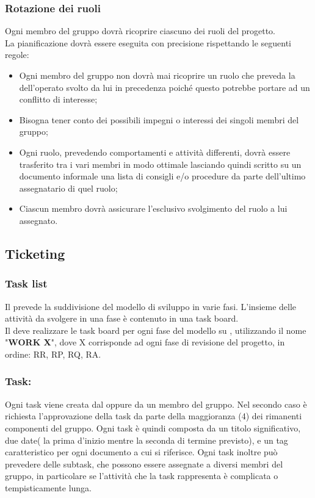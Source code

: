\documentclass[NormeDiProgetto.tex]{subfiles}
\begin{document}
	\subsubsection{Rotazione dei ruoli}
	Ogni membro del gruppo dovrà ricoprire ciascuno dei ruoli del progetto.\\
	La pianificazione dovrà essere eseguita con precisione rispettando le seguenti regole:
	\begin{itemize}
		\item Ogni membro del gruppo non dovrà mai ricoprire un ruolo che preveda la  dell'operato svolto da lui in precedenza poiché questo potrebbe	portare ad un conflitto di interesse;
		\item Bisogna tener conto dei possibili impegni o interessi dei singoli membri del gruppo;
		\item Ogni ruolo, prevedendo comportamenti e attività differenti, dovrà essere trasferito tra i vari membri in modo ottimale lasciando quindi scritto su un documento informale una lista di consigli e/o procedure da parte dell'ultimo assegnatario di quel ruolo;
		\item Ciascun membro dovrà assicurare l'esclusivo svolgimento del ruolo a lui assegnato.
	\end{itemize}
	
	
	\subsection{Ticketing}
	\subsubsection{Task list}
	Il \pdp{} prevede la suddivisione del modello di sviluppo in varie fasi.
	L'insieme delle attività da svolgere in una fase è contenuto in una task board.\\
	Il \respdiprog{} deve realizzare le task board per ogni fase del modello su , utilizzando il nome "\textbf{WORK X}", dove X corrisponde ad ogni fase di revisione del progetto, in ordine: RR, RP, RQ, RA.
	
	\subsubsection{Task:}
	Ogni task viene creata dal \respdiprog{} oppure da un membro del gruppo. Nel secondo caso è richiesta l'approvazione della task da parte della maggioranza (4) dei rimanenti componenti del gruppo.
	Ogni task è quindi composta da un titolo significativo, due date( la prima d'inizio mentre la seconda di termine previsto), e un tag caratteristico per ogni documento a cui si riferisce. Ogni task inoltre può prevedere delle subtask, che possono essere assegnate a diversi membri del gruppo, in particolare se l'attività che la task rappresenta è complicata o tempisticamente lunga.
	
\end{document}

